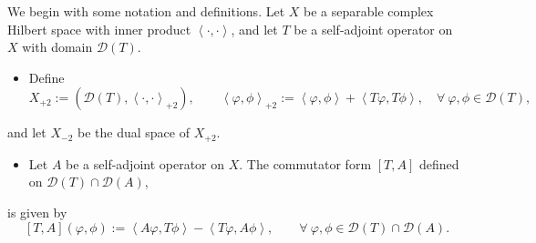 \documentclass[reqno, 11pt]{amsart}
\newcommand\mcaD{\mathcal{D}}
\numberwithin{equation}{section}
\begin{document}
We begin with some notation and definitions. Let $X$ be a separable complex Hilbert space with inner product $\left<\cdot,\cdot\right>$, and let $T$ be a self-adjoint operator on $X$ with domain $\mcaD(T)$.
\begin{itemize}
\item
Define
$$X_{+2}:=\left(\mcaD(T),\left<\cdot,\cdot\right>_{+2}\right), \qquad \left<\varphi,\phi\right>_{+2}:=\left<\varphi,\phi\right>+\left<T\varphi,T\phi\right>,\quad\forall\ \varphi,\phi\in\mcaD(T),$$
\end{itemize}
and let $X_{-2}$ be the dual space of $X_{+2}$.
\begin{itemize}
\item Let $A$ be a self-adjoint operator on $X$. The commutator form $[T,A]$ defined on $\mcaD(T)\cap\mcaD(A)$,
    \end{itemize}
     is given by
\begin{equation}\label{Sesqui-form}
   [T,A](\varphi,\phi):=\left<A\varphi,T\phi\right>-\left<T\varphi,A\phi\right>,\qquad \forall\ \varphi,\phi\in\mcaD(T)\cap\mcaD(A).
\end{equation}
\end{document}

